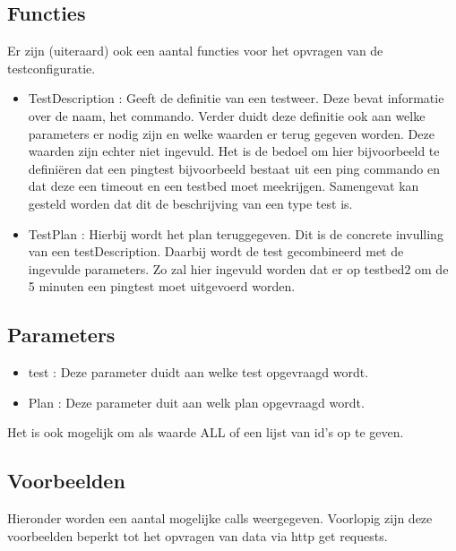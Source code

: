 \documentclass[11pt]{article}
\begin{document}
\subsection{Functies}
Er zijn (uiteraard) ook een aantal functies voor het opvragen van de testconfiguratie.
\begin{itemize}
\item TestDescription : Geeft de definitie van een testweer. Deze bevat informatie over de naam, het commando. Verder duidt deze definitie ook aan welke parameters er nodig zijn en welke waarden er terug gegeven worden. Deze waarden zijn echter niet ingevuld. Het is de bedoel om hier bijvoorbeeld te defini\"eren dat een pingtest bijvoorbeeld bestaat uit een ping commando en dat deze een timeout en een testbed moet meekrijgen. Samengevat kan gesteld worden dat dit de beschrijving van een type test is.
\item TestPlan : Hierbij wordt het plan teruggegeven. Dit is de concrete invulling van een testDescription. Daarbij wordt de test gecombineerd met de ingevulde parameters. Zo zal hier ingevuld worden dat er op testbed2 om de 5 minuten een pingtest moet uitgevoerd worden.
\end{itemize}

\subsection{Parameters}

\begin{itemize}
\item test : Deze parameter duidt aan welke test opgevraagd wordt.
\item Plan : Deze parameter duit aan welk plan opgevraagd wordt.
\end{itemize}
Het is ook mogelijk om als waarde ALL of een lijst van id's op te geven.

\subsection{Voorbeelden}
Hieronder worden een aantal mogelijke calls weergegeven. Voorlopig zijn deze voorbeelden beperkt tot het opvragen van data via http get requests.

\clearpage
\end{document}
